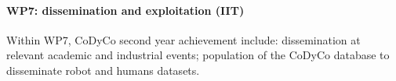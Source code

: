 

\paragraph*{WP7: dissemination and exploitation (IIT)}

Within WP7, CoDyCo second year achievement include: dissemination at relevant academic and industrial events; population of the CoDyCo database to disseminate robot and humans datasets. 